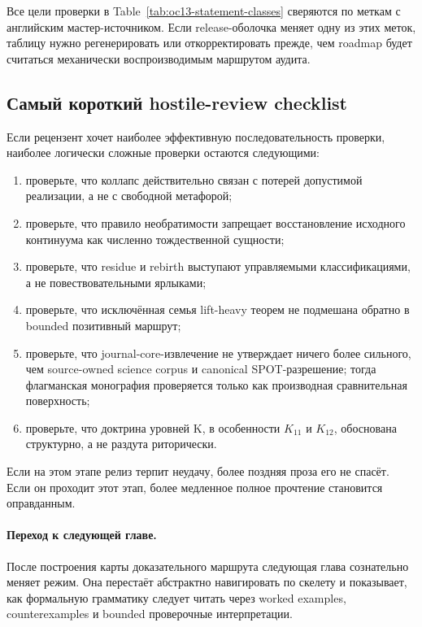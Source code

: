 Все цели проверки в Table~\ref{tab:oc13-statement-classes} сверяются по меткам с английским мастер-источником. Если release-оболочка меняет одну из этих меток, таблицу нужно регенерировать или откорректировать прежде, чем roadmap будет считаться механически воспроизводимым маршрутом аудита.

\subsection{Самый короткий hostile-review checklist}

Если рецензент хочет наиболее эффективную последовательность проверки, наиболее логически сложные проверки остаются следующими:

\begin{enumerate}
\item проверьте, что коллапс действительно связан с потерей допустимой реализации, а не с свободной метафорой;
\item проверьте, что правило необратимости запрещает восстановление исходного континуума как численно тождественной сущности;
\item проверьте, что residue и rebirth выступают управляемыми классификациями, а не повествовательными ярлыками;
\item проверьте, что исключённая семья lift-heavy теорем не подмешана обратно в bounded позитивный маршрут;
\item проверьте, что journal-core-извлечение не утверждает ничего более сильного, чем source-owned science corpus и canonical SPOT-разрешение; тогда флагманская монография проверяется только как производная сравнительная поверхность;
\item проверьте, что доктрина уровней K, в особенности \(K_{11}\) и \(K_{12}\), обоснована структурно, а не раздута риторически.
\end{enumerate}

Если на этом этапе релиз терпит неудачу, более поздняя проза его не спасёт. Если он проходит этот этап, более медленное полное прочтение становится оправданным.

\paragraph{Переход к следующей главе.}
После построения карты доказательного маршрута следующая глава сознательно меняет режим. Она перестаёт абстрактно навигировать по скелету и показывает, как формальную грамматику следует читать через worked examples, counterexamples и bounded проверочные интерпретации.

